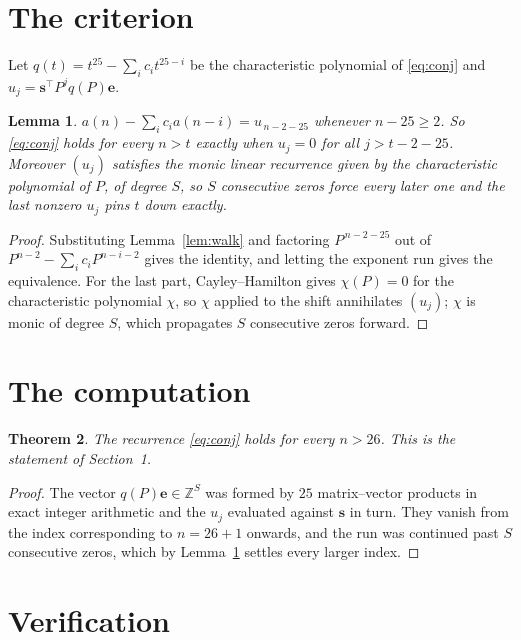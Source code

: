 \documentclass[11pt,a4paper]{article}
\theoremstyle{plain}
\newtheorem{theorem}{Theorem}
\newtheorem{lemma}[theorem]{Lemma}
\theoremstyle{definition}
\begin{document}
\section{The criterion}

Let $q(t)=t^{25}-\sum_i c_i t^{25-i}$ be the characteristic polynomial of
\eqref{eq:conj} and $u_j=\mathbf{s}^{\!\top}P^{j}q(P)\mathbf{e}$.

\begin{lemma}\label{lem:crit}
$a(n)-\sum_i c_i a(n-i)=u_{\,n-2-25}$ whenever $n-25\ge2$. So \eqref{eq:conj}
holds for every $n>t$ exactly when $u_j=0$ for all $j>t-2-25$. Moreover $(u_j)$
satisfies the monic linear recurrence given by the characteristic polynomial of $P$, of
degree $S$, so $S$ consecutive zeros force every later one and the last nonzero $u_j$ pins
$t$ down exactly.
\end{lemma}

\begin{proof}
Substituting Lemma~\ref{lem:walk} and factoring $P^{\,n-2-25}$ out of
$P^{n-2}-\sum_i c_i P^{n-i-2}$ gives the identity, and letting the exponent run gives the
equivalence. For the last part, Cayley--Hamilton gives $\chi(P)=0$ for the characteristic
polynomial $\chi$, so $\chi$ applied to the shift annihilates $(u_j)$; $\chi$ is monic of
degree $S$, which propagates $S$ consecutive zeros forward.
\end{proof}

\section{The computation}

\begin{theorem}
The recurrence \eqref{eq:conj} holds for every $n>26$. This is the statement of
Section~1.
\end{theorem}

\begin{proof}
The vector $q(P)\mathbf{e}\in\mathbb{Z}^{S}$ was formed by $25$ matrix--vector
products in exact integer arithmetic and the $u_j$ evaluated against $\mathbf{s}$ in turn.
They vanish from the index corresponding to $n=26+1$ onwards, and the run was continued
past $S$ consecutive zeros, which by Lemma~\ref{lem:crit} settles every larger index.
\end{proof}

\section{Verification}
\end{document}
